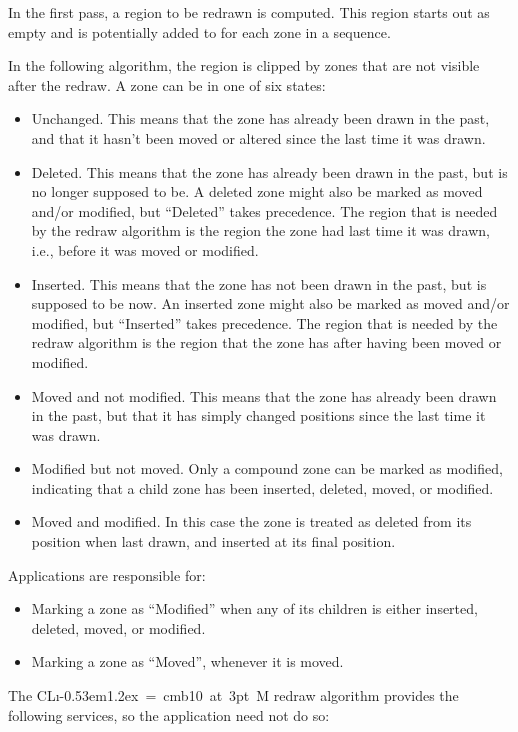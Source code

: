 \documentclass{report}
\def\Tiny{ \font\Tinyfont = cmb10 at 3pt \relax  \Tinyfont}
\def\clim{\textsf{CL{\i}\kern-0.53em\raise1.2ex\hbox{\Tiny 3}M}}
\begin{document}
In the first pass, a region to be redrawn is computed.  This region
starts out as empty and is potentially added to for each zone in a
sequence.  

In the following algorithm, the region is clipped by zones that are
not visible after the redraw.  A zone can be in one of six states:

\begin{itemize}
\item Unchanged.  This means that the zone has already been drawn in
  the past, and that it hasn't been moved or altered since the last
  time it was drawn.
\item Deleted.  This means that the zone has already been drawn in
  the past, but is no longer supposed to be.  A deleted zone
  might also be marked as moved and/or modified, but ``Deleted'' takes
  precedence.  The region that is needed by the redraw algorithm is
  the region the zone had last time it was drawn, i.e., before
  it was moved or modified.
\item Inserted.  This means that the zone has not been drawn in the
  past, but is supposed to be now.  An inserted zone might also be
  marked as moved and/or modified, but ``Inserted'' takes precedence.
  The region that is needed by the redraw algorithm is the region that
  the zone has after having been moved or modified.
\item Moved and not modified.  This means that the zone has already
  been drawn in the past, but that it has simply changed positions
  since the last time it was drawn.
\item Modified but not moved.  Only a compound zone can be marked as
  modified, indicating that a child zone has been
  inserted, deleted, moved, or modified.
\item Moved and modified.  In this case the zone is treated as
  deleted from its position when last drawn, and inserted at its
  final position. 
\end{itemize}

Applications are responsible for:

\begin{itemize}
\item Marking a zone as ``Modified'' when any of its children is
  either inserted, deleted, moved, or modified.
\item Marking a zone as ``Moved'', whenever it is moved. 
\end{itemize}

The \clim{} redraw algorithm provides the following services, so the
application need not do so:
\end{document}
